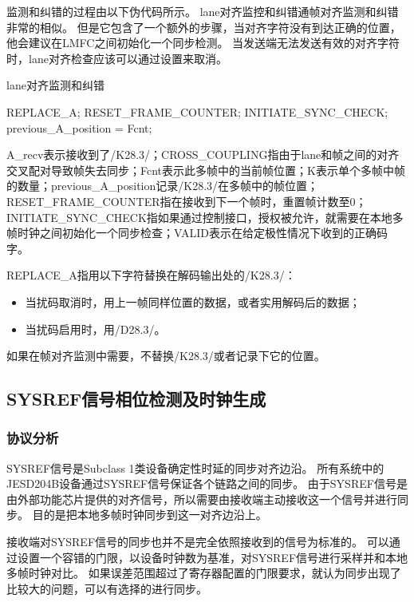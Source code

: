 \documentclass[UTF8]{ctexart}
\begin{document}
监测和纠错的过程由以下伪代码所示。
lane对齐监控和纠错通帧对齐监测和纠错非常的相似。
但是它包含了一个额外的步骤，当对齐字符没有到达正确的位置，他会建议在LMFC之间初始化一个同步检测。
当发送端无法发送有效的对齐字符时，lane对齐检查应该可以通过设置来取消。

\begin{algorithm}[H]
	\caption{lane对齐监测和纠错}
    \begin{algorithmic}[1]
    		\State REPLACE\_A;
    			\State RESET\_FRAME\_COUNTER;
    				\State INITIATE\_SYNC\_CHECK;
    			\EndIf
    		\EndIf
    			\State previous\_A\_position = Fcnt;
    		\EndIf
    	\EndIf
    \end{algorithmic}
\end{algorithm}

A\_recv表示接收到了/K28.3/；CROSS\_COUPLING指由于lane和帧之间的对齐交叉配对导致帧失去同步；Fcnt表示此多帧中的当前帧位置；K表示单个多帧中帧的数量；previous\_A\_position记录/K28.3/在多帧中的帧位置；RESET\_FRAME\_COUNTER指在接收到下一个帧时，重置帧计数至0；INITIATE\_SYNC\_CHECK指如果通过控制接口，授权被允许，就需要在本地多帧时钟之间初始化一个同步检查；VALID表示在给定极性情况下收到的正确码字。

REPLACE\_A指用以下字符替换在解码输出处的/K28.3/：
\begin{itemize}
	\item 当扰码取消时，用上一帧同样位置的数据，或者实用解码后的数据；
	\item 当扰码启用时，用/D28.3/。
\end{itemize}
如果在帧对齐监测中需要，不替换/K28.3/或者记录下它的位置。

\subsection{SYSREF信号相位检测及时钟生成}

\subsubsection{协议分析}

SYSREF信号是Subclass 1类设备确定性时延的同步对齐边沿。
所有系统中的JESD204B设备通过SYSREF信号保证各个链路之间的同步。
由于SYSREF信号是由外部功能芯片提供的对齐信号，所以需要由接收端主动接收这一个信号并进行同步。
目的是把本地多帧时钟同步到这一对齐边沿上。

接收端对SYSREF信号的同步也并不是完全依照接收到的信号为标准的。
可以通过设置一个容错的门限，以设备时钟数为基准，对SYSREF信号进行采样并和本地多帧时钟对比。
如果误差范围超过了寄存器配置的门限要求，就认为同步出现了比较大的问题，可以有选择的进行同步。
\end{document}
